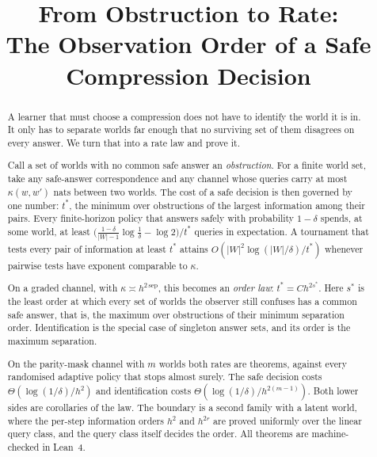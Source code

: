 



\title{From Obstruction to Rate:\\The Observation Order of a Safe Compression Decision}

\author{
}

\maketitle

\begin{abstract}
A learner that must choose a compression does not have to identify the world it is in. It
only has to separate worlds far enough that no surviving set of them disagrees on every
answer. We turn that into a rate law and prove it.

Call a set of worlds with no common safe answer an \emph{obstruction}. For a finite world
set, take any safe-answer correspondence and any channel whose queries carry at most
$\kappa(w,w')$ nats between two worlds. The cost of a safe decision is then governed by one
number: $t^{*}$, the minimum over obstructions of the largest information among their pairs.
Every finite-horizon policy that answers safely with probability $1-\delta$ spends, at some
world, at least $\bigl(\frac{1-\delta}{|W|-1}\log\frac1\delta-\log2\bigr)/t^{*}$ queries in
expectation. A tournament that tests every pair of information at least $t^{*}$ attains
$O(|W|^{2}\log(|W|/\delta)/t^{*})$ whenever pairwise tests have exponent comparable to
$\kappa$.

On a graded channel, with $\kappa\asymp h^{2\,\mathrm{sep}}$, this becomes an \emph{order law}:
$t^{*}=Ch^{2s^{*}}$. Here $s^{*}$ is the least order at which every set of worlds the observer
still confuses has a common safe answer, that is, the maximum over obstructions of their
minimum separation order. Identification is the special case of singleton answer sets, and its
order is the maximum separation.

On the parity-mask channel with $m$ worlds both rates are theorems, against every randomised
adaptive policy that stops almost surely. The safe decision costs
$\Theta(\log(1/\delta)/h^{2})$ and identification costs $\Theta(\log(1/\delta)/h^{2(m-1)})$. Both
lower sides are corollaries of the law. The boundary is a second family with a latent world,
where the per-step information orders $h^{2}$ and $h^{2r}$ are proved uniformly over the linear
query class, and the query class itself decides the order. All theorems are machine-checked in
Lean~4.
\end{abstract}

